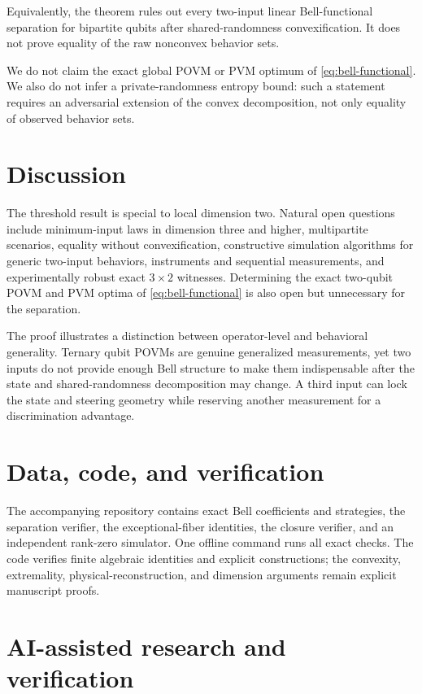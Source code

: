 \documentclass[11pt]{article}
\theoremstyle{definition}
\begin{document}
Equivalently, the theorem rules out every two-input linear Bell-functional
separation for bipartite qubits after shared-randomness convexification. It
does not prove equality of the raw nonconvex behavior sets.

We do not claim the exact global POVM or PVM optimum of
\eqref{eq:bell-functional}. We also do not infer a private-randomness entropy
bound: such a statement requires an adversarial extension of the convex
decomposition, not only equality of observed behavior sets.

\section{Discussion}

The threshold result is special to local dimension two. Natural open
questions include minimum-input laws in dimension three and higher,
multipartite scenarios, equality without convexification, constructive
simulation algorithms for generic two-input behaviors, instruments and
sequential measurements, and experimentally robust exact \(3\times2\)
witnesses. Determining the exact two-qubit POVM and PVM optima of
\eqref{eq:bell-functional} is also open but unnecessary for the separation.

The proof illustrates a distinction between operator-level and behavioral
generality. Ternary qubit POVMs are genuine generalized measurements, yet two
inputs do not provide enough Bell structure to make them indispensable after
the state and shared-randomness decomposition may change. A third input can
lock the state and steering geometry while reserving another measurement for
a discrimination advantage.

\section*{Data, code, and verification}

The accompanying repository contains exact Bell coefficients and strategies,
the separation verifier, the exceptional-fiber identities, the closure
verifier, and an independent rank-zero simulator. One offline command runs
all exact checks. The code verifies finite algebraic identities and explicit
constructions; the convexity, extremality, physical-reconstruction, and
dimension arguments remain explicit manuscript proofs.

\section*{AI-assisted research and verification}
\end{document}
